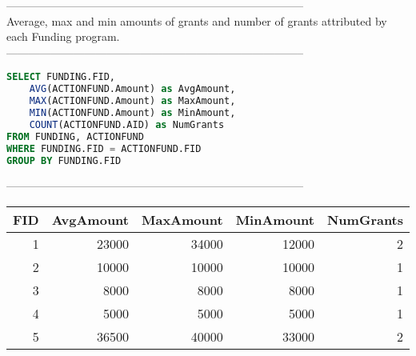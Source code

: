 --------------------------------------------------------------------------------
\\Average, max and min amounts of grants and number of grants attributed by each Funding program.\\
--------------------------------------------------------------------------------
\begin{lstlisting}[language = SQL]
SELECT FUNDING.FID, 
	AVG(ACTIONFUND.Amount) as AvgAmount, 
	MAX(ACTIONFUND.Amount) as MaxAmount, 
	MIN(ACTIONFUND.Amount) as MinAmount, 
	COUNT(ACTIONFUND.AID) as NumGrants 
FROM FUNDING, ACTIONFUND 
WHERE FUNDING.FID = ACTIONFUND.FID 
GROUP BY FUNDING.FID
\end{lstlisting}
--------------------------------------------------------------------------------
\\\begin{tabular}{rrrrr}
\toprule
   FID &   AvgAmount &   MaxAmount &   MinAmount &   NumGrants \\
\midrule
     1 &       23000 &       34000 &       12000 &           2 \\
     2 &       10000 &       10000 &       10000 &           1 \\
     3 &        8000 &        8000 &        8000 &           1 \\
     4 &        5000 &        5000 &        5000 &           1 \\
     5 &       36500 &       40000 &       33000 &           2 \\
\bottomrule
\end{tabular}